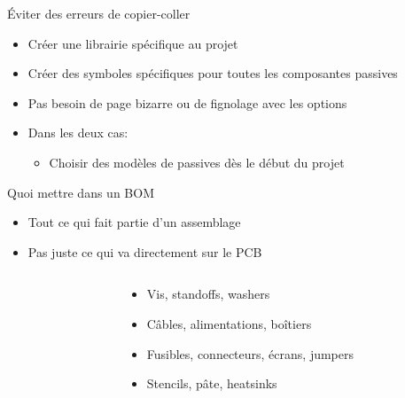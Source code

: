 \begin{frame}{Éviter des erreurs de copier-coller}
    \begin{itemize}
        \item Créer une librairie spécifique au projet
        \item Créer des symboles spécifiques pour toutes les composantes passives
        \item Pas besoin de page bizarre ou de fignolage avec les options
        \bigskip
        \item Dans les deux cas:
        \begin{itemize}
            \item Choisir des modèles de passives dès le début du projet
        \end{itemize}
    \end{itemize}
\end{frame}

\begin{frame}{Quoi mettre dans un BOM}
    \begin{twocolumns}
        \leftcol
        \begin{itemize}
            \item Tout ce qui fait partie d'un assemblage
            \item Pas juste ce qui va directement sur le PCB
        \end{itemize}

        \footnotesize
        \begin{columns}
            \begin{column}{0.05\textwidth}
            \end{column}
            \begin{column}{0.95\textwidth}
                \begin{itemize}
                    \item Vis, standoffs, washers
                    \item Câbles, alimentations, boîtiers
                    \item Fusibles, connecteurs, écrans, jumpers
                    \item Stencils, pâte, heatsinks
                \end{itemize}
            \end{column}
        \end{columns}
        \rightcol
    \end{twocolumns}
    
    \begin{columns}
        \begin{column}{0.33\textwidth}
        \end{column}
        \begin{column}{0.33\textwidth}
        \end{column}
        \begin{column}{0.33\textwidth}
        \end{column}
    \end{columns}
\end{frame}

